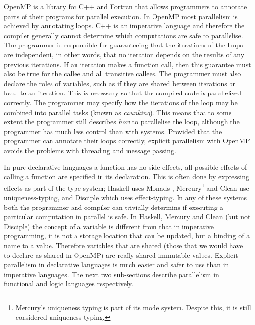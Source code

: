 OpenMP \citep{openmp} is a library for C++ \citep{cplusplus} and Fortran
that allows programmers to annotate parts of their programs for parallel
execution.
In OpenMP most parallelism is achieved by annotating loops.
C++ is an imperative language and therefore the compiler generally cannot
determine which computations are safe to parallelise.
The programmer is responsible for guaranteeing that the iterations
of the loops are independent,
in other words, that no iteration depends on the results of any previous
iterations.
If an iteration makes a function call, then this guarantee must also be true for
the callee and all transitive callees.
The programmer must also declare the roles of variables,
such as if they are shared between iterations or local to an iteration.
This is necessary so that the compiled code is parallelised correctly.
The programmer may specify how the iterations of the loop may be
combined into parallel tasks (known as \emph{chunking}).
This means that to some extent the programmer still describes \emph{how} to
parallelise the loop,
although the programmer has much less control than with \pvc systems.
Provided that the programmer can annotate their loops correctly,
explicit parallelism with OpenMP avoids the problems
with threading and message passing.

In pure declarative languages
a function has no side effects,
all possible effects of calling a function are specified in its 
declaration.
This is often done by expressing effects as part of the type system;
Haskell \citep{haskell98} uses Monads \citep{haskell-monads},
Mercury\footnote{
    Mercury's uniqueness typing is part of its mode system.
    Despite this, it is still considered uniqueness typing.}
\citep{mercury_jlp}
and Clean \citep{brus:1987:clean}
use
uniqueness-typing, and 
Disciple \citep{ddc} which uses effect-typing.
In any of these systems both the programmer and compiler can trivially
determine if executing a particular computation in parallel is safe.
In Haskell, Mercury and Clean (but not Disciple)
the concept of a variable is different from that in imperative programming,
it is not a storage location that can be updated,
but a binding of a name to a value.
Therefore variables that are shared
(those that we would have to declare as shared in OpenMP)
are really shared immutable values.
Explicit parallelism in declarative languages is much easier and safer to use
than in imperative languages.
The next two sub-sections describe parallelism in functional and logic
languages respectively.

